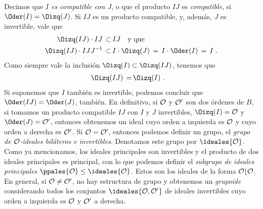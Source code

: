 Decimos que \emph{$I$ es compatible con $J$}, o que el producto
$IJ$ es \emph{compatible}, si $\Oder(I)=\Oizq(J)$. Si $IJ$ es un producto
compatible, y, adem\'{a}s, $J$ es invertible, vale que
\begin{align*}
	\Oizq(IJ)\cdot IJ\,\subset\, & IJ\quad\text{y que} \\
	\Oizq(IJ)\cdot IJJ^{-1} \,\subset\, & I\cdot\Oizq(J)
	\,=\,I\cdot\Oder(I)\,=\,I
	\text{ .}
\end{align*}
%
Como siempre vale la inclusi\'{o}n $\Oizq(I)\subset\Oizq(IJ)$, tenemos que
\begin{align*}
	\Oizq(IJ) \,=\, & \Oizq(I)
	\text{ .}
\end{align*}
%
Si suponemos que $I$ tambi\'{e}n es invertible, podemos concluir que
$\Oder(IJ)=\Oder(J)$, tambi\'{e}n. En definitiva, si $\cal{O}$ y $\cal{O}'$
son dos \'{o}rdenes de $B$, si tomamos un producto compatible $IJ$
con $I$ y $J$ invertibles, $\Oizq(I)=\cal{O}$ y $\Oder(J)=\cal{O}'$,
entonces obtenemos un ideal cuyo orden a izquierda es $\cal{O}$ y
cuyo orden a derecha es $\cal{O}'$. Si $\cal{O}=\cal{O}'$, entonces
podemos definir un grupo, el \emph{grupo de $\cal{O}$-ideales bil\'{a}teros %
e invertibles}. Denotamos este grupo por $\ideales{\cal{O}}$. Como
ya mencionamos, los ideales principales son invertibles y el producto de
dos ideales principales es principal, con lo que podemos definir el
\emph{subgrupo de ideales principales} $\ppales{\cal{O}}\leq\ideales{\cal{O}}$.
Estos son los ideales de la forma $\cal{O}b\cal{O}$.
En general, si $\cal{O}\not =\cal{O}'$, no hay estructura de grupo
y obtenemos un \emph{grupoide} considerando todos los
conjuntos $\ideales{\cal{O},\cal{O}'}$ de ideales invertibles
cuyo orden a izquierda es $\cal{O}$ y $\cal{O}'$ a derecha.

